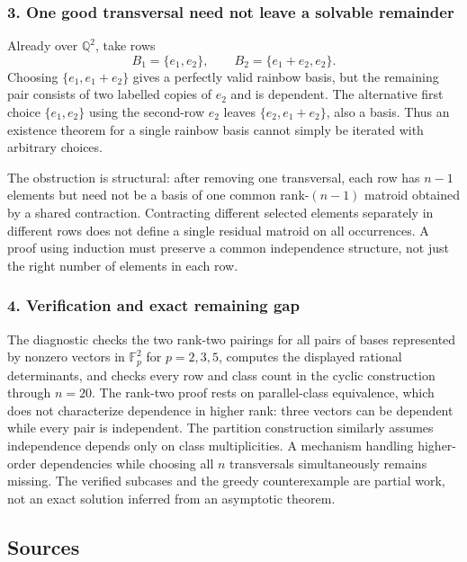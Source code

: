 \documentclass[11pt,a4paper]{article}
\begin{document}
\subsubsection{3. One good transversal need not leave a solvable remainder}
Already over $\mathbb Q^2$, take rows
\[B_1=\{e_1,e_2\},\qquad B_2=\{e_1+e_2,e_2\}.
\]
Choosing $\{e_1,e_1+e_2\}$ gives a perfectly valid rainbow basis, but the remaining pair consists of two labelled copies of $e_2$ and is dependent. The alternative first choice $\{e_1,e_2\}$ using the second-row $e_2$ leaves $\{e_2,e_1+e_2\}$, also a basis. Thus an existence theorem for a single rainbow basis cannot simply be iterated with arbitrary choices.

The obstruction is structural: after removing one transversal, each row has $n-1$ elements but need not be a basis of one common rank-$(n-1)$ matroid obtained by a shared contraction. Contracting different selected elements separately in different rows does not define a single residual matroid on all occurrences. A proof using induction must preserve a common independence structure, not just the right number of elements in each row.

\subsubsection{4. Verification and exact remaining gap}
The diagnostic checks the two rank-two pairings for all pairs of bases represented by nonzero vectors in $\mathbb F_p^2$ for $p=2,3,5$, computes the displayed rational determinants, and checks every row and class count in the cyclic construction through $n=20$. The rank-two proof rests on parallel-class equivalence, which does not characterize dependence in higher rank: three vectors can be dependent while every pair is independent. The partition construction similarly assumes independence depends only on class multiplicities. A mechanism handling higher-order dependencies while choosing all $n$ transversals simultaneously remains missing. The verified subcases and the greedy counterexample are partial work, not an exact solution inferred from an asymptotic theorem.

\subsection{Sources}
\end{document}
